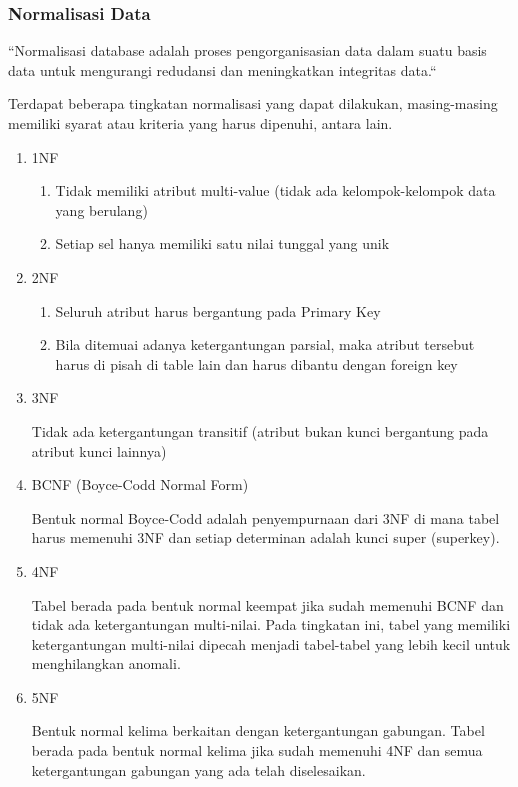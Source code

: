 \documentclass[12pt,a4paper]{article}
\begin{document}
\subsubsection{Normalisasi Data}

\cite{normtelkom} ``Normalisasi database adalah proses pengorganisasian data
dalam suatu basis data untuk mengurangi redudansi dan meningkatkan integritas
data.``

Terdapat beberapa tingkatan normalisasi yang dapat dilakukan, masing-masing
memiliki syarat atau kriteria yang harus dipenuhi, antara lain.

\begin{enumerate}
  \item 1NF
    \begin{enumerate}
      \item Tidak memiliki atribut multi-value (tidak ada kelompok-kelompok data yang berulang)
      \item Setiap sel hanya memiliki satu nilai tunggal yang unik
    \end{enumerate}

  \item 2NF
    \begin{enumerate}
      \item Seluruh atribut harus bergantung pada Primary Key
      \item Bila ditemuai adanya ketergantungan parsial, maka atribut tersebut harus di pisah di table lain dan harus dibantu dengan foreign key
    \end{enumerate}

  \item 3NF

    Tidak ada ketergantungan transitif (atribut bukan kunci bergantung pada atribut kunci lainnya)

  \item BCNF (Boyce-Codd Normal Form)

    Bentuk normal Boyce-Codd adalah penyempurnaan dari 3NF di mana tabel harus memenuhi 3NF dan setiap determinan adalah kunci super (superkey).

  \item 4NF

    Tabel berada pada bentuk normal keempat jika sudah memenuhi BCNF dan tidak ada ketergantungan multi-nilai. Pada tingkatan ini, tabel yang memiliki ketergantungan multi-nilai dipecah menjadi tabel-tabel yang lebih kecil untuk menghilangkan anomali.

  \item 5NF

    Bentuk normal kelima berkaitan dengan ketergantungan gabungan. Tabel berada pada bentuk normal kelima jika sudah memenuhi 4NF dan semua ketergantungan gabungan yang ada telah diselesaikan.

\end{enumerate}
\end{document}
